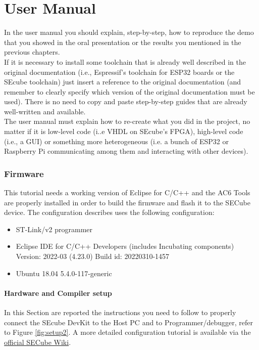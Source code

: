 \chapter{User Manual}
\label{usermanual}

In the user manual you should explain, step-by-step, how to reproduce the demo that you showed in the oral presentation or the results you mentioned in the previous chapters.\\ If it is necessary to install some toolchain that is already well described in the original documentation (i.e., Espressif's toolchain for ESP32 boards or the SEcube toolchain) just insert a reference to the original documentation (and remember to clearly specify which version of the original documentation must be used). There is no need to copy and paste step-by-step guides that are already well-written and available.\\The user manual must explain how to re-create what you did in the project, no matter if it is low-level code (i..e VHDL on SEcube's FPGA), high-level code (i.e., a GUI) or something more heterogeneous (i.e. a bunch of ESP32 or Raspberry Pi communicating among them and interacting with other devices).

\subsection{Firmware}
This tutorial needs a working version of Eclipse for C/C++ and the AC6 Tools are properly installed in order to build the firmware and flash it to the SECube device. The configuration describes uses the following configuration:
\begin{itemize}
	\item ST-Link/v2 programmer
	\item Eclipse IDE for C/C++ Developers (includes Incubating components) Version: 2022-03 (4.23.0) Build id: 20220310-1457
	\item Ubuntu 18.04 5.4.0-117-generic
\end{itemize}

\subsubsection{Hardware and Compiler setup}
In this Section are reported the instructions you need to follow to properly connect the SEcube DevKit to the Host PC and to Programmer/debugger, refer to Figure \ref{fig:setup2}. A more detailed configuration tutorial is available via the  \href{https://github.com/SEcube-Project/SEcube-SDK/blob/master/wiki/wiki_rel_012.pdf}{official SECube Wiki}.

